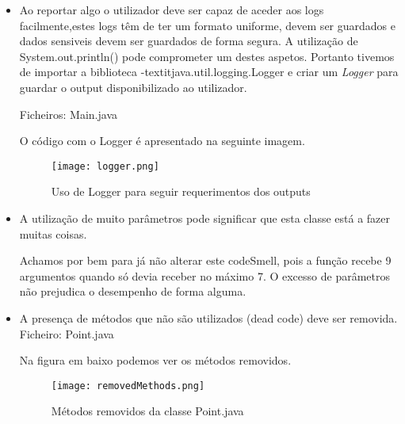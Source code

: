 \begin{itemize}
\item Ao reportar algo o utilizador deve ser capaz de aceder aos logs facilmente,estes logs têm de ter um formato uniforme, devem ser guardados e dados sensiveis devem ser guardados de forma segura. A utilização de System.out.println() pode comprometer um destes aspetos. Portanto tivemos de importar a biblioteca -textit{java.util.logging.Logger} e criar um \textit{Logger} para guardar o output disponibilizado ao utilizador.\newline

 Ficheiros: Main.java\newline

\par O código com o Logger é apresentado na seguinte imagem.

 \begin{figure}[H]

  \centering

  \texttt{[image: logger.png]}

  \caption {Uso de Logger para seguir requerimentos dos outputs}

  \label {fig10}

\end{figure}
\end{itemize}

\begin{itemize}
\item A utilização de muito parâmetros pode significar que esta classe está a fazer muitas coisas. 

\par Achamos por bem para já não alterar este codeSmell, pois a função recebe 9 argumentos quando só devia receber no máximo 7. O excesso de parâmetros não prejudica o desempenho de forma alguma.

\end{itemize}

\begin{itemize}
\item A presença de métodos que não são utilizados (dead code) deve ser removida. \newline
Ficheiro: Point.java \newline

\par Na figura em baixo podemos ver os métodos removidos.
 \begin{figure}[H]

  \centering

  \texttt{[image: removedMethods.png]}

  \caption {Métodos removidos da classe Point.java}

  \label {fig10}

\end{figure}
\end{itemize}

















